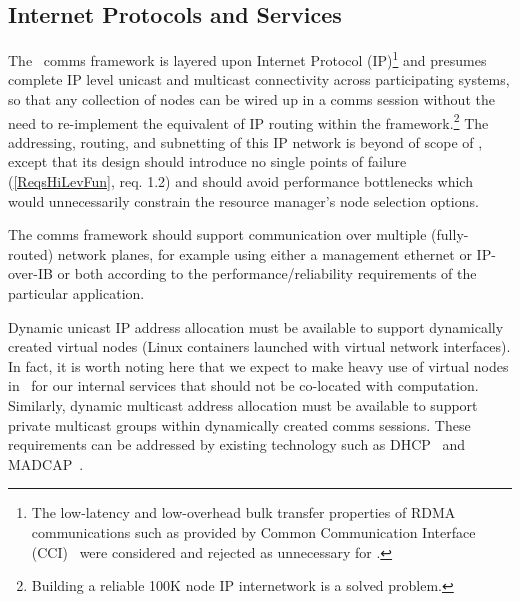 \subsection{Internet Protocols and Services}
\label{sect:commsIP}

The \ngrm\ comms framework is layered upon Internet Protocol (IP)\footnote{
The low-latency and low-overhead bulk transfer properties of RDMA
communications such as provided by Common Communication
Interface (CCI)~\cite{CCI} were considered and rejected as unnecessary
for \ngrm.}
and presumes
complete IP level unicast and multicast connectivity across participating
systems, so that any
collection of nodes can be wired up in a comms session without
the need to re-implement the equivalent of IP routing within
the framework.\footnote{Building a reliable 100K node IP internetwork
is a solved problem.} 
The addressing, routing, and subnetting of this IP network is beyond of
scope of \ngrm, except that its design should introduce no single
points of failure (\ref{ReqsHiLevFun}, req. 1.2)
and should avoid performance bottlenecks which
would unnecessarily constrain the resource manager's node selection options.

The comms framework should support communication over multiple
(fully-routed) network planes, for example using either a management
ethernet or IP-over-IB or both according to the performance/reliability
requirements of the particular application.

Dynamic unicast IP address allocation must be available to support
dynamically created virtual nodes (Linux containers launched with
virtual network interfaces).  In fact, it is worth noting here that
we expect to make heavy use of virtual nodes in \ngrm\ for our internal
services that should not be co-located with computation.
Similarly,
dynamic multicast address allocation must be available to support
private multicast groups within dynamically created comms sessions.
These requirements can be addressed by existing technology such as
DHCP~\cite{rfc2131} and MADCAP~\cite{rfc2730}.

